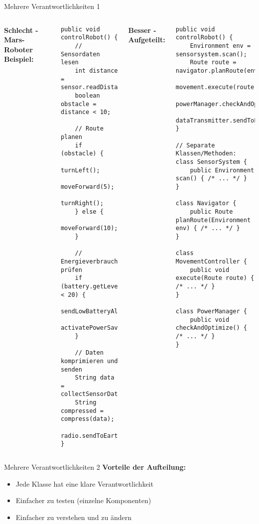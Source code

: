 \begin{frame}[fragile]{Mehrere Verantwortlichkeiten 1}
  \begin{columns}[T]
    \textbf{Schlecht - Mars-Roboter Beispiel:}
    \begin{lstlisting}[style=java, basicstyle=\tiny\ttfamily]
public void controlRobot() {
    // Sensordaten lesen
    int distance = sensor.readDistance();
    boolean obstacle = distance < 10;

    // Route planen
    if (obstacle) {
        turnLeft();
        moveForward(5);
        turnRight();
    } else {
        moveForward(10);
    }

    // Energieverbrauch prüfen
    if (battery.getLevel() < 20) {
        sendLowBatteryAlert();
        activatePowerSaving();
    }

    // Daten komprimieren und senden
    String data = collectSensorData();
    String compressed = compress(data);
    radio.sendToEarth(compressed);
}
    \end{lstlisting}

    \textbf{Besser - Aufgeteilt:}
    \begin{lstlisting}[style=java, basicstyle=\tiny\ttfamily]
public void controlRobot() {
    Environment env = sensorsystem.scan();
    Route route = navigator.planRoute(env);
    movement.execute(route);
    powerManager.checkAndOptimize();
    dataTransmitter.sendToEarth();
}

// Separate Klassen/Methoden:
class SensorSystem {
    public Environment scan() { /* ... */ }
}

class Navigator {
    public Route planRoute(Environment env) { /* ... */ }
}

class MovementController {
    public void execute(Route route) { /* ... */ }
}

class PowerManager {
    public void checkAndOptimize() { /* ... */ }
}
    \end{lstlisting}
  \end{columns}
\end{frame}

\begin{frame}[fragile]{Mehrere Verantwortlichkeiten 2}
  \textbf{Vorteile der Aufteilung:}
  \begin{itemize}
    \item Jede Klasse hat eine klare Verantwortlichkeit
    \item Einfacher zu testen (einzelne Komponenten)
    \item Einfacher zu verstehen und zu ändern
  \end{itemize}
\end{frame}

